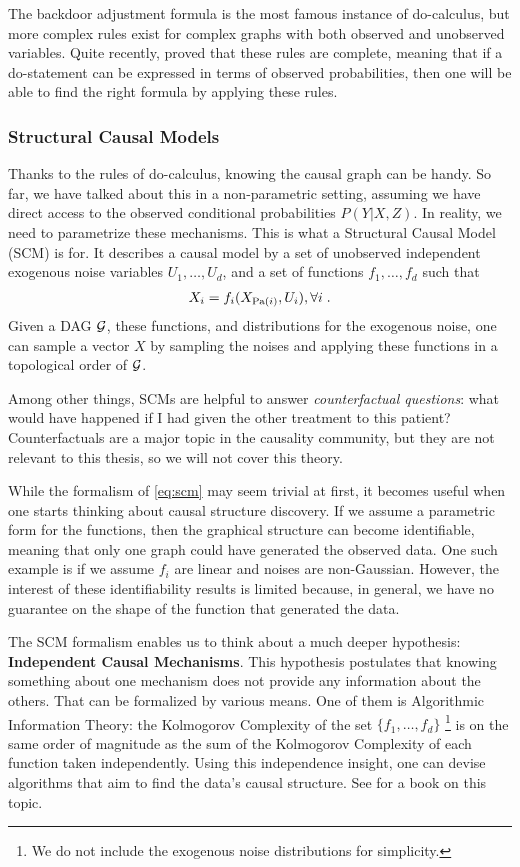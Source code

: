 The backdoor adjustment formula is the most famous instance of do-calculus, but more complex rules exist for complex graphs with both observed and unobserved variables. Quite recently, \citet{huang2012pearl} proved that these rules are complete, meaning that if a do-statement can be expressed in terms of observed probabilities, then one will be able to find the right formula by applying these rules.



\subsubsection{Structural Causal Models}

Thanks to the rules of do-calculus, knowing the causal graph can be handy. So far, we have talked about this in a non-parametric setting, assuming we have direct access to the observed conditional probabilities $P(Y|X, Z)$. In reality, we need to parametrize these mechanisms. This is what a Structural Causal Model (SCM) is for. It describes a causal model by a set of unobserved independent exogenous noise variables $U_1, \dots, U_d$, and a set of functions $f_1, \dots, f_d$ such that
\begin{align}
	X_i = f_i(X_{\operatorname{\mathrm{Pa}}(i)}, U_i), \forall i \;.
	\label{eq:scm}
\end{align}
Given a DAG ${\mathcal G}$, these functions, and distributions for the exogenous noise, one can sample a vector $X$ by sampling the noises and applying these functions in a topological order of ${\mathcal G}$.

Among other things, SCMs are helpful to answer \textit{counterfactual questions}: what would have happened if I had given the other treatment to this patient? Counterfactuals are a major topic in the causality community, but they are not relevant to this thesis, so we will not cover this theory.

While the formalism of \eqref{eq:scm} may seem trivial at first, it becomes useful when one starts thinking about causal structure discovery.
If we assume a parametric form for the functions, then the graphical structure can become identifiable, meaning that only one graph could have generated the observed data. One such example is if we assume $f_i$ are linear and noises are non-Gaussian.
However, the interest of these identifiability results is limited because, in general, we have no guarantee on the shape of the function that generated the data.

The SCM formalism enables us to think about a much deeper hypothesis: \textbf{Independent Causal Mechanisms}. This hypothesis postulates that knowing something about one mechanism does not provide any information about the others. That can be formalized by various means. One of them is Algorithmic Information Theory: the Kolmogorov Complexity of the set $\{ f_1, \dots, f_d \}$
\footnote{We do not include the exogenous noise distributions for simplicity.}
is on the same order of magnitude as the sum of the Kolmogorov Complexity of each function taken independently.
Using this independence insight, one can devise algorithms that aim to find the data's causal structure. See \citet{peters2017elements} for a book on this topic.

